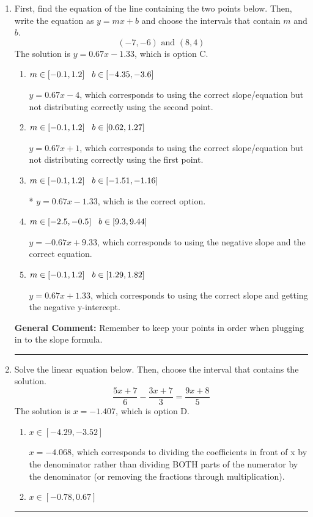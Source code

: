 \documentclass{extbook}[14pt]
\newcommand{\litem}[1]{\item #1

\rule{\textwidth}{0.4pt}}
\begin{document}
\begin{enumerate}\litem{
First, find the equation of the line containing the two points below. Then, write the equation as $ y=mx+b $ and choose the intervals that contain $m$ and $b$.
\[ (-7, -6) \text{ and } (8, 4) \]The solution is \( y = 0.67x -1.33 \), which is option C.\begin{enumerate}[label=\Alph*.]
\item \( m \in [-0.1, 1.2] \hspace*{3mm} b \in [-4.35, -3.6] \)

 $y = 0.67x -4$, which corresponds to using the correct slope/equation but not distributing correctly using the second point.
\item \( m \in [-0.1, 1.2] \hspace*{3mm} b \in [0.62, 1.27] \)

 $y = 0.67x + 1$, which corresponds to using the correct slope/equation but not distributing correctly using the first point.
\item \( m \in [-0.1, 1.2] \hspace*{3mm} b \in [-1.51, -1.16] \)

* $y = 0.67x -1.33$, which is the correct option.
\item \( m \in [-2.5, -0.5] \hspace*{3mm} b \in [9.3, 9.44] \)

 $y = -0.67x + 9.33$, which corresponds to using the negative slope and the correct equation.
\item \( m \in [-0.1, 1.2] \hspace*{3mm} b \in [1.29, 1.82] \)

 $y = 0.67x + 1.33$, which corresponds to using the correct slope and getting the negative y-intercept.
\end{enumerate}

\textbf{General Comment:} Remember to keep your points in order when plugging in to the slope formula.
}
\litem{
Solve the linear equation below. Then, choose the interval that contains the solution.
\[ \frac{5x + 7}{6} - \frac{3x + 7}{3} = \frac{9x + 8}{5} \]The solution is \( x = -1.407 \), which is option D.\begin{enumerate}[label=\Alph*.]
\item \( x \in [-4.29, -3.52] \)

 $x = -4.068$, which corresponds to dividing the coefficients in front of x by the denominator rather than dividing BOTH parts of the numerator by the denominator (or removing the fractions through multiplication).
\item \( x \in [-0.78, 0.67] \)


\end{enumerate}}
\end{enumerate}
\end{document}
